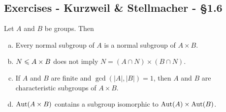 \subsection{Exercises - Kurzweil \& Stellmacher - \S 1.6}

\begin{exr}Let\/ $A$ and $B$ be groups. Then
    \begin{enumerate}[a),font=\upshape]
    \item Every normal subgroup of\/ $A$ is a normal subgroup of\/ $A \times B$.
    \item $N \leqslant A \times B$ does not imply\/ $N = (A \cap N) \times (B \cap N)$.
    \item If\/ $A$ and\/ $B$ are finite and\/ $\gcd(|A|, |B|) = 1$, then\/ $A$ and\/ $B$ are characteristic subgroups of\/ $A \times B$.
    \item ${\rm Aut}(A \times B)$ contains a subgroup isomorphic to\/ ${\rm Aut}(A) \times {\rm Aut}(B)$.
    \end{enumerate}
\end{exr}

